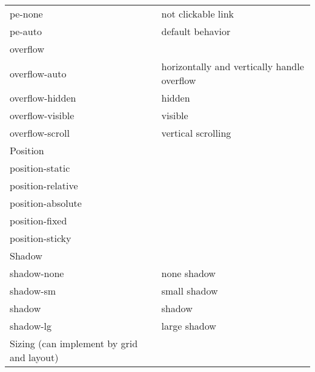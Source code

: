 \documentclass{article}
\begin{document}
\begin{longtable}{ll}
			pe-none                                     & not clickable link                          \\
			pe-auto                                     & default behavior                            \\ \hline
			overflow                                    &                                             \\ \hline
			overflow-auto                               & horizontally and vertically handle overflow \\
			overflow-hidden                             & hidden                                      \\
			overflow-visible                            & visible                                     \\
			overflow-scroll                             & vertical scrolling                          \\ \hline
			Position                                    &                                             \\ \hline
			position-static                             &                                             \\
			position-relative                           &                                             \\
			position-absolute                           &                                             \\
			position-fixed                              &                                             \\
			position-sticky                             &                                             \\ \hline
			Shadow                                      &                                             \\ \hline
			shadow-none                                 & none shadow                                 \\
			shadow-sm                                   & small shadow                                \\
			shadow                                      & shadow                                      \\
			shadow-lg                                   & large shadow                                \\ \hline
			Sizing (can implement by grid and layout)   &                                             \\ \hline

\end{longtable}
\end{document}
